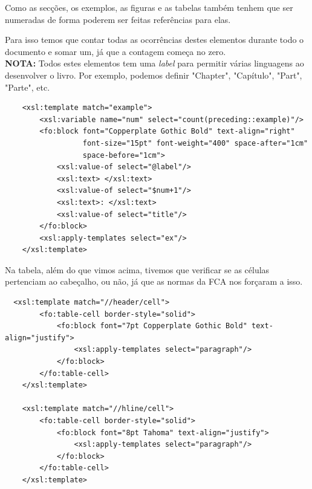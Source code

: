\documentclass[a4paper]{article}
\begin{document}
\hspace{1cm}Como as secções, os exemplos, as figuras e as tabelas também tenhem que ser numeradas de forma poderem ser feitas referências para elas.

\hspace{1cm}Para isso temos que contar todas as ocorrências destes elementos durante todo o documento e somar um, já que a contagem começa no zero.\\

\textbf{NOTA:} Todos estes elementos tem uma {\em label} para permitir várias linguagens ao desenvolver o livro. Por exemplo, podemos definir "Chapter", "Capítulo", "Part", "Parte", etc.\\

\begin{small}
\begin{lstlisting}
    <xsl:template match="example">
        <xsl:variable name="num" select="count(preceding::example)"/>
        <fo:block font="Copperplate Gothic Bold" text-align="right"
                  font-size="15pt" font-weight="400" space-after="1cm"
                  space-before="1cm">
            <xsl:value-of select="@label"/>
            <xsl:text> </xsl:text>
            <xsl:value-of select="$num+1"/>
            <xsl:text>: </xsl:text>
            <xsl:value-of select="title"/>
        </fo:block>
        <xsl:apply-templates select="ex"/>
    </xsl:template>
\end{lstlisting}
\end{small}

\hspace{1cm}Na tabela, além do que vimos acima, tivemos que verificar se as células pertenciam ao cabeçalho, ou não, já que as normas da FCA nos forçaram a isso.\\

\begin{small}
\begin{lstlisting}
  <xsl:template match="//header/cell">
        <fo:table-cell border-style="solid">
            <fo:block font="7pt Copperplate Gothic Bold" text-align="justify">
                <xsl:apply-templates select="paragraph"/>
            </fo:block>
        </fo:table-cell>
    </xsl:template>

    <xsl:template match="//hline/cell">
        <fo:table-cell border-style="solid">
            <fo:block font="8pt Tahoma" text-align="justify">
                <xsl:apply-templates select="paragraph"/>
            </fo:block>
        </fo:table-cell>
    </xsl:template>
\end{lstlisting}
\end{small}
\end{document}
